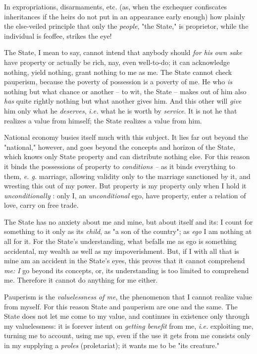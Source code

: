 \documentclass[a4paper]{book}
\begin{document}
In expropriations, disarmaments, etc. (as, when the exchequer confiscates 
inheritances if the heirs do not put in an appearance early enough) how 
plainly the else-veiled principle that only the \textit{people}, "{}the 
State,"{} is proprietor, while the individual is feoffee, strikes the eye!

The State, I mean to say, cannot intend that anybody should \textit{for his 
own sake} have property or actually be rich, nay, even well-to-do; it can 
acknowledge nothing, yield nothing, grant nothing to me as me. The State 
cannot check pauperism, because the poverty of possession is a poverty of me. 
He who \textit{is} nothing but what chance or another -- to wit, the State -- 
makes out of him also \textit{has} quite rightly nothing but what another 
gives him. And this other will \textit{give} him only what he 
\textit{deserves}, \textit{i.e.} what he is worth by \textit{service}. It is 
not he that realizes a value from himself; the State realizes a value from 
him.

National economy busies itself much with this subject. It lies far out beyond 
the "{}national,"{} however, and goes beyond the concepts and horizon of the 
State, which knows only State property and can distribute nothing else. For 
this reason it binds the possessions of property to \textit{conditions --} as 
it binds everything to them, \textit{e. g.} marriage, allowing validity only 
to the marriage sanctioned by it, and wresting this out of my power. But 
property is my property only when I hold it \textit{unconditionally} : only I, 
an \textit{unconditional} ego, have property, enter a relation of love, carry 
on free trade.

The State has no anxiety about me and mine, but about itself and its: I count 
for something to it only as its \textit{child}, as "{}a son of the country"{}; 
as \textit{ego} I am nothing at all for it. For the State's understanding, 
what befalls me as ego is something accidental, my wealth as well as my 
impoverishment. But, if I with all that is mine am an accident in the State's 
eyes, this proves that it cannot comprehend \textit{me: I} go beyond its 
concepts, or, its understanding is too limited to comprehend me. Therefore it 
cannot do anything for me either.

Pauperism is the \textit{valuelessness of me}, the phenomenon that I cannot 
realize value from myself. For this reason State and pauperism are one and the 
same. The State does not let me come to my value, and continues in existence 
only through my valuelessness: it is forever intent on \textit{getting 
benefit} from me, \textit{i.e.} exploiting me, turning me to account, using me 
up, even if the use it gets from me consists only in my supplying a 
\textit{proles} (proletariat); it wants me to be "{}its creature."{}
\end{document}
